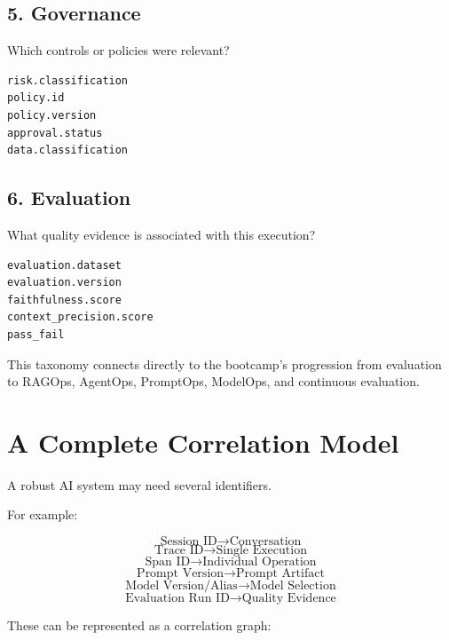 \documentclass[11pt,a4paper]{article}
\begin{document}
\subsection{5. Governance}

Which controls or policies were relevant?

\begin{lstlisting}
risk.classification
policy.id
policy.version
approval.status
data.classification
\end{lstlisting}

\subsection{6. Evaluation}

What quality evidence is associated with this execution?

\begin{lstlisting}
evaluation.dataset
evaluation.version
faithfulness.score
context_precision.score
pass_fail
\end{lstlisting}

This taxonomy connects directly to the bootcamp's progression from evaluation to RAGOps, AgentOps, PromptOps, ModelOps, and continuous evaluation.

\section{A Complete Correlation Model}

A robust AI system may need several identifiers.

For example:

\[
\text{Session ID} \rightarrow \text{Conversation}
\]
\[
\text{Trace ID} \rightarrow \text{Single Execution}
\]
\[
\text{Span ID} \rightarrow \text{Individual Operation}
\]
\[
\text{Prompt Version} \rightarrow \text{Prompt Artifact}
\]
\[
\text{Model Version/Alias} \rightarrow \text{Model Selection}
\]
\[
\text{Evaluation Run ID} \rightarrow \text{Quality Evidence}
\]

These can be represented as a correlation graph:
\end{document}
